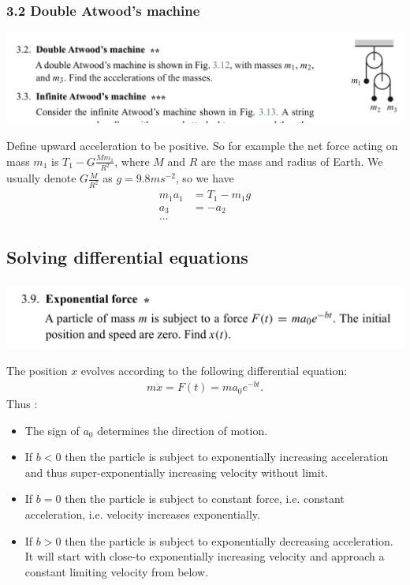 \subsubsection*{3.2 Double Atwood's machine}
\begin{mdframed}
  \includegraphics[width=400pt]{img/physics--classical-mechanics--morin--3-2.png}
\end{mdframed}
Define upward acceleration to be positive. So for example the net force acting on mass $m_1$ is
$T_1 - G\frac{Mm_1}{R^2}$, where $M$ and $R$ are the mass and radius of Earth. We usually denote
$G\frac{M}{R^2}$ as $g = 9.8ms^{-2}$, so we have
\begin{align*}
  m_1a_1 &= T_1 - m_1g \\
  a_3 &= -a_2 \\
  ...
\end{align*}



\subsection*{Solving differential equations}
\subsubsection*{}
\begin{mdframed}
  \includegraphics[width=400pt]{img/physics--classical-mechanics--morin--3-9.png}
\end{mdframed}

The position $x$ evolves according to the following differential equation:
\begin{align*}
  m\ddot{x} = F(t) = ma_0e^{-bt}.
\end{align*}
Thus :
\begin{itemize}
\item The sign of $a_0$ determines the direction of motion.
\item If $b < 0$ then the particle is subject to exponentially increasing acceleration and thus
  super-exponentially increasing velocity without limit.
\item If $b = 0$ then the particle is subject to constant force, i.e. constant acceleration,
  i.e. velocity increases exponentially.
\item If $b > 0$ then the particle is subject to exponentially decreasing acceleration. It will
  start with close-to exponentially increasing velocity and approach a constant limiting velocity
  from below.
\end{itemize}

